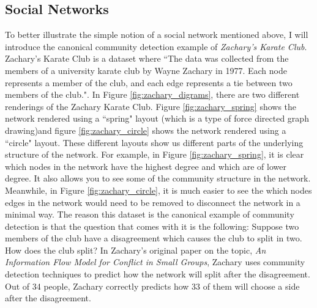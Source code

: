\subsection{Social Networks}\label{sec:Social Networks}
To better illustrate the simple notion of a social network mentioned above, I will introduce the canonical community detection example of \emph{Zachary's Karate Club}. Zachary's Karate Club is a dataset where ``The data was collected from the members of a university karate club by Wayne Zachary in 1977.  Each node represents a member of the club, and each edge represents a tie between two members of the club."\cite[Metadata]{konect:2017:ucidata-zachary}. In Figure \ref{fig:zachary_digrams}, there are two different renderings of the Zachary Karate Club. Figure \ref{fig:zachary_spring} shows the network rendered using a ``spring" layout (which is a type of force directed graph drawing\cite{kobourov12})and figure \ref{fig:zachary_circle} shows the network rendered using a ``circle" layout. These different layouts show us different parts of the underlying structure of the network. For example, in Figure \ref{fig:zachary_spring}, it is clear which nodes in the network have the highest degree and which are of lower degree. It also allows you to see some of the community structure in the network. Meanwhile, in Figure \ref{fig:zachary_circle}, it is much easier to see the which nodes edges in the network would need to be removed to disconnect the network in a minimal way. The reason this dataset is the canonical example of community detection is that the question that comes with it is the following: Suppose two members of the club have a disagreement which causes the club to split in two. How does the club split? In Zachary's original paper on the topic, \emph{An Information Flow Model for Conflict in Small Groups}\cite{konect:ucidata-zachary}, Zachary uses community detection techniques to predict how the network will split after the disagreement. Out of 34 people, Zachary correctly predicts how 33 of them will choose a side after the disagreement.

